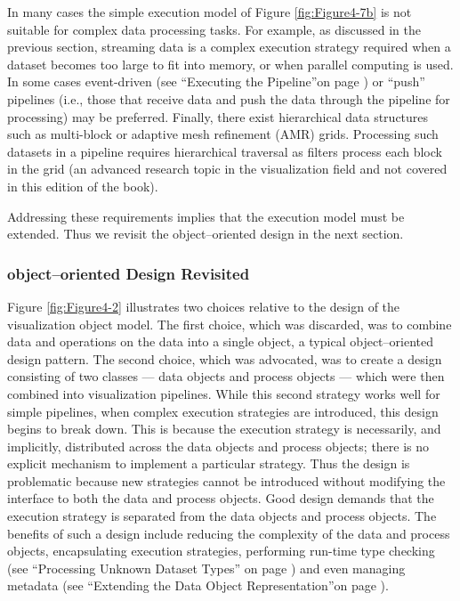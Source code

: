 In many cases the simple execution model of Figure \ref{fig:Figure4-7b} is not suitable for complex data processing tasks. For example, as discussed in the previous section, streaming data is a complex execution strategy required when a dataset becomes too large to fit into memory, or when parallel computing is used. In some cases event-driven (see ``Executing the Pipeline''on page \pageref{sec:executing_pipeline}) or ``push'' pipelines (i.e., those that receive data and push the data through the pipeline for processing) may be preferred. Finally, there exist hierarchical data structures such as multi-block or adaptive mesh refinement (AMR) \cite{Berger84} grids. Processing such datasets in a pipeline requires hierarchical traversal as filters process each block in the grid (an advanced research topic in the visualization field and not covered in this edition of the book).

Addressing these requirements implies that the execution model must be extended. Thus we revisit the object--oriented design in the next section.

\subsubsection{object--oriented Design Revisited}
\label{subsubsec:object_oriented_design_revisited}

Figure \ref{fig:Figure4-2} illustrates two choices relative to the design of the visualization object model. The first choice, which was discarded, was to combine data and operations on the data into a single object, a typical object--oriented design pattern. The second choice, which was advocated, was to create a design consisting of two classes --- data objects and process objects --- which were then combined into visualization pipelines. While this second strategy works well for simple pipelines, when complex execution strategies are introduced, this design begins to break down. This is because the execution strategy is necessarily, and implicitly, distributed across the data objects and process objects; there is no explicit mechanism to implement a particular strategy. Thus the design is problematic because new strategies cannot be introduced without modifying the interface to both the data and process objects. Good design demands that the execution strategy is separated from the data objects and process objects. The benefits of such a design include reducing the complexity of the data and process objects, encapsulating execution strategies, performing run-time type checking (see ``Processing Unknown Dataset Types'' on page \pageref{subsec:processing_unknown_dataset_types}) and even managing metadata (see ``Extending the Data Object Representation''on page  \pageref{subsec:extending_data_object_representation}).


